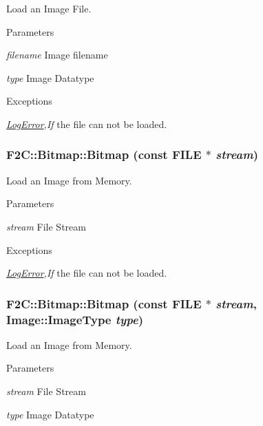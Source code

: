 Load an Image File. 
\begin{DoxyParams}{Parameters}
\item[{\em filename}]Image filename \item[{\em type}]Image Datatype \end{DoxyParams}

\begin{DoxyExceptions}{Exceptions}
\item[{\em \hyperlink{class_f2_c_1_1_log_error}{LogError},If}]the file can not be loaded. \end{DoxyExceptions}
\hypertarget{class_f2_c_1_1_bitmap_ab70cd9b1ee024f477c4329a50aeb3d65}{
\subsubsection[{Bitmap}]{\setlength{\rightskip}{0pt plus 5cm}F2C::Bitmap::Bitmap (const FILE $\ast$ {\em stream})}}
\label{class_f2_c_1_1_bitmap_ab70cd9b1ee024f477c4329a50aeb3d65}


Load an Image from Memory. 
\begin{DoxyParams}{Parameters}
\item[{\em stream}]File Stream \end{DoxyParams}

\begin{DoxyExceptions}{Exceptions}
\item[{\em \hyperlink{class_f2_c_1_1_log_error}{LogError},If}]the file can not be loaded. \end{DoxyExceptions}
\hypertarget{class_f2_c_1_1_bitmap_a71aea59a7da710e1e8ff17270b25c0e4}{
\subsubsection[{Bitmap}]{\setlength{\rightskip}{0pt plus 5cm}F2C::Bitmap::Bitmap (const FILE $\ast$ {\em stream}, \/  Image::ImageType {\em type})}}
\label{class_f2_c_1_1_bitmap_a71aea59a7da710e1e8ff17270b25c0e4}


Load an Image from Memory. 
\begin{DoxyParams}{Parameters}
\item[{\em stream}]File Stream \item[{\em type}]Image Datatype \end{DoxyParams}

